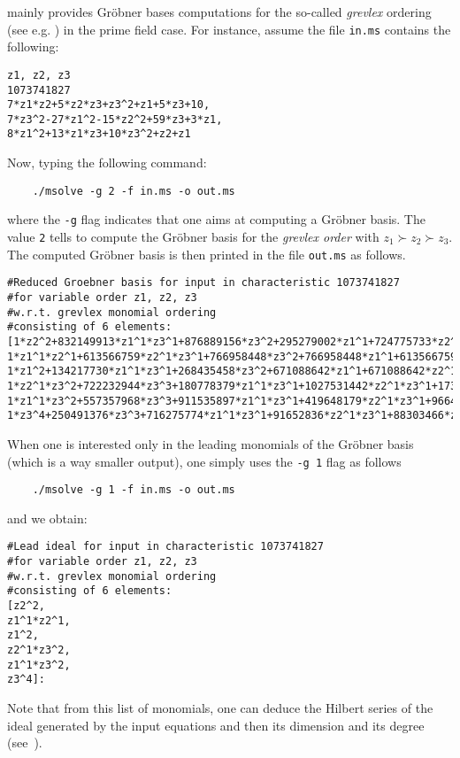 \documentclass[a4paper,english,11pt]{scrartcl}
\theoremstyle{definition}
\theoremstyle{remark}
\begin{document}
\msolve mainly provides Gr\"obner bases computations for the so-called {\em
  grevlex} ordering (see e.g. \cite{CLO}) in the prime field case. For instance,
assume the file \verb+in.ms+ contains the following:
\begin{tcolorbox}
\begin{verbatim}
z1, z2, z3 
1073741827
7*z1*z2+5*z2*z3+z3^2+z1+5*z3+10,
7*z3^2-27*z1^2-15*z2^2+59*z3+3*z1,
8*z1^2+13*z1*z3+10*z3^2+z2+z1
\end{verbatim}
\end{tcolorbox}
Now, typing the following command:
\begin{tcolorbox}
  \begin{lstlisting}
    ./msolve -g 2 -f in.ms -o out.ms 
  \end{lstlisting}
\end{tcolorbox}
where the \verb+-g+ flag indicates that one aims at computing a Gr\"obner
basis. The value \verb+2+ tells \msolve to compute the Gr\"obner basis for the
{\em grevlex order} with $z_1\succ z_2 \succ z_3 $. The computed Gr\"obner basis
is then printed in the file \verb+out.ms+ as follows.
\begin{tcolorbox}
  {\tiny
\begin{lstlisting}[breaklines]
#Reduced Groebner basis for input in characteristic 1073741827
#for variable order z1, z2, z3
#w.r.t. grevlex monomial ordering
#consisting of 6 elements:
[1*z2^2+832149913*z1^1*z3^1+876889156*z3^2+295279002*z1^1+724775733*z2^1+143165573*z3^1,
1*z1^1*z2^1+613566759*z2^1*z3^1+766958448*z3^2+766958448*z1^1+613566759*z3^1+153391691,
1*z1^2+134217730*z1^1*z3^1+268435458*z3^2+671088642*z1^1+671088642*z2^1,
1*z2^1*z3^2+722232944*z3^3+180778379*z1^1*z3^1+1027531442*z2^1*z3^1+173735741*z3^2+936498976*z1^1+702034498*z2^1+921316952*z3^1+59915395,
1*z1^1*z3^2+557357968*z3^3+911535897*z1^1*z3^1+419648179*z2^1*z3^1+96648475*z3^2+698659259*z1^1+282295066*z2^1+885328953*z3^1+769127629,
1*z3^4+250491376*z3^3+716275774*z1^1*z3^1+91652836*z2^1*z3^1+88303466*z3^2+855797860*z1^1+18642214*z2^1+728901227*z3^1+969918485]:
\end{lstlisting}
}
\end{tcolorbox}
When one is interested only in the leading monomials of the Gr\"obner basis
(which is a way smaller output), one simply uses the \verb+-g 1+ flag as follows
\begin{tcolorbox}
  \begin{lstlisting}
    ./msolve -g 1 -f in.ms -o out.ms 
  \end{lstlisting}
\end{tcolorbox}
and we obtain:
\begin{tcolorbox}
  {\tiny
\begin{lstlisting}[breaklines]
#Lead ideal for input in characteristic 1073741827
#for variable order z1, z2, z3
#w.r.t. grevlex monomial ordering
#consisting of 6 elements:
[z2^2,
z1^1*z2^1,
z1^2,
z2^1*z3^2,
z1^1*z3^2,
z3^4]:
\end{lstlisting}
}
\end{tcolorbox}
Note that from this list of monomials, one can deduce the Hilbert series of the
ideal generated by the input equations and then its dimension and its degree
(see~\cite{CLO}).
\end{document}
